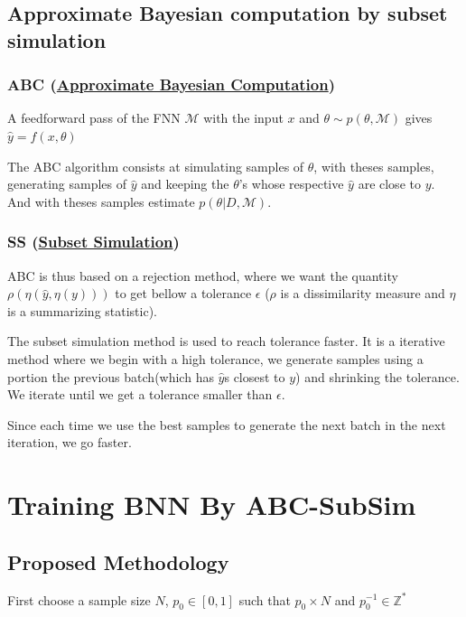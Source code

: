 \documentclass{article}
\begin{document}
\subsection{Approximate Bayesian computation by subset simulation}

\subsubsection{ABC (\href{https://en.wikipedia.org/wiki/Approximate_Bayesian_computation}{Approximate Bayesian Computation})}

    A feedforward pass of the FNN $\mathcal{M}$  with the input $x$ and $\theta \sim p(\theta, \mathcal{M})$ gives $\hat{y} = f(x, \theta)$ 

    The ABC algorithm consists at simulating samples of $\theta$, with theses samples, generating samples of $\hat{y}$ and keeping the $\theta$'s whose respective $\hat{y}$ are close to $y$. And with theses samples estimate $p(\theta | D, \mathcal{M})$.

\subsubsection{SS (\href{https://en.wikipedia.org/wiki/Subset_simulation}{Subset Simulation})}

    ABC is thus based on a rejection method, where we want the quantity $\rho(\eta(\hat{y}, \eta(y)))$ to get bellow a tolerance $\epsilon$ ($\rho$ is a dissimilarity measure and $\eta$ is a summarizing statistic).
    
    The subset simulation method is used to reach tolerance faster. It is a iterative method where we begin with a high tolerance, we generate samples using a portion the previous batch(which has $\hat{y}$s closest to $y$) and shrinking the tolerance. We iterate until we get a tolerance smaller than $\epsilon$.

    Since each time we use the best samples to generate the next batch in the next iteration, we go faster.

\section{Training BNN By ABC-SubSim}
\subsection{Proposed Methodology}

First choose a sample size $N$, $p_0 \in [0,1]$ such that $p_0\times N$ and $p_0^{-1} \in \mathbb{Z}^*$
\end{document}
